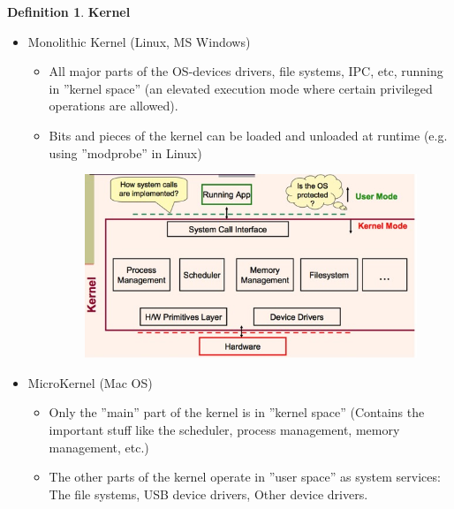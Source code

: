 \documentclass[12pt,a4paper]{article}
\theoremstyle{definition}
\newtheorem{definition}{Definition}[section]
\newenvironment{myitemize}
{ \begin{itemize}
    \setlength{\itemsep}{5pt}
    \setlength{\parskip}{0pt}
    \setlength{\parsep}{0pt}     }
{ \end{itemize}                  }
\begin{document}
\begin{definition}{\textbf{Kernel}}
	\begin{myitemize}
		\item \textsf{Monolithic Kernel} (Linux, MS Windows)
		\begin{myitemize}
			\item All major parts of the OS-devices drivers, file systems, IPC, etc, running in ''kernel space'' (an elevated execution mode where certain privileged operations are allowed).
			\item Bits and pieces of the kernel can be loaded and unloaded at runtime (e.g. using ''modprobe'' in Linux)
			\begin{figure}[h!]
				\includegraphics[scale=0.35]{m1/monolithicKernels}
				\centering
			\end{figure}
		\end{myitemize}
		\item \textsf{MicroKernel} (Mac OS)
		\begin{myitemize}
			\item Only the ''main'' part of the kernel is in ''kernel space'' (Contains the important stuff like the scheduler, process management, memory management, etc.)
			\item The other parts of the kernel operate in ''user space'' as system services: The file systems, USB device drivers, Other device drivers.
		\end{myitemize}
	\end{myitemize}
\end{definition}
\end{document}
